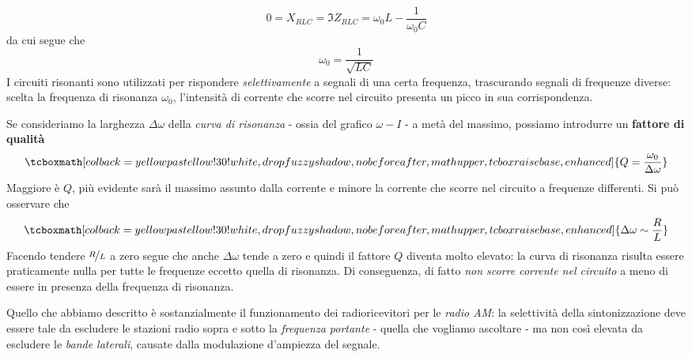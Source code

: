 \begin{equation*}
	0=X_{RLC}=\Im Z_{RLC}=\omega_0 L-\frac{1}{\omega_0 C}
\end{equation*}
da cui segue che
\begin{equation*}
	\omega_0=\frac{1}{\sqrt{LC}}
\end{equation*}
I circuiti risonanti sono utilizzati per rispondere \textit{selettivamente} a segnali di una certa frequenza, trascurando segnali di frequenze diverse: scelta la frequenza di risonanza $\omega_0$, l'intensità di corrente che scorre nel circuito presenta un picco in sua corrispondenza.

Se consideriamo la larghezza $\Delta \omega$ della \textit{curva di risonanza} - ossia del grafico $\omega-I$ - a metà del massimo, possiamo introdurre un \textbf{fattore di qualità}
\begin{equation}
	\tcboxmath[colback=yellowpastellow!30!white,drop fuzzy shadow, nobeforeafter, math upper, tcbox raise base, enhanced]{Q=\frac{\omega_0}{\Delta \omega}}
\end{equation}
Maggiore è $Q$, più evidente sarà il massimo assunto dalla corrente e minore la corrente che scorre nel circuito a frequenze differenti. Si può osservare che
\begin{equation}
	\tcboxmath[colback=yellowpastellow!30!white,drop fuzzy shadow, nobeforeafter, math upper, tcbox raise base, enhanced]{\Delta \omega\sim \frac{R}{L}}
\end{equation}
Facendo tendere $\nicefrac{R}{L}$ a zero segue che anche $\Delta \omega$ tende a zero e quindi il fattore $Q$ diventa molto elevato: la curva di risonanza risulta essere praticamente nulla per tutte le frequenze eccetto quella di risonanza. Di conseguenza, di fatto \textit{non scorre corrente nel circuito} a meno di essere in presenza della frequenza di risonanza.

Quello che abbiamo descritto è sostanzialmente il funzionamento dei radioricevitori per le \textit{radio AM}: la selettività della sintonizzazione deve essere tale da escludere le stazioni radio sopra e sotto la \textit{frequenza portante} - quella che vogliamo ascoltare -  ma non così elevata da escludere le \textit{bande laterali}, causate dalla modulazione d'ampiezza del segnale.
